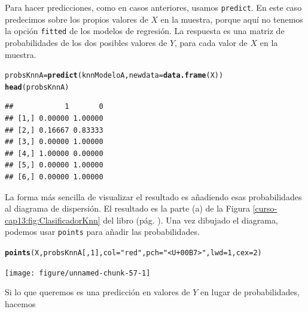 \documentclass[10pt,a4paper]{article}\usepackage[]{graphicx}\usepackage[]{color}
\makeatletter
\newcommand{\hlnum}[1]{\textcolor[rgb]{0.686,0.059,0.569}{#1}}%
\newcommand{\hlstr}[1]{\textcolor[rgb]{0.192,0.494,0.8}{#1}}%
\newcommand{\hlstd}[1]{\textcolor[rgb]{0.345,0.345,0.345}{#1}}%
\newcommand{\hlkwb}[1]{\textcolor[rgb]{0.69,0.353,0.396}{#1}}%
\newcommand{\hlkwc}[1]{\textcolor[rgb]{0.333,0.667,0.333}{#1}}%
\newcommand{\hlkwd}[1]{\textcolor[rgb]{0.737,0.353,0.396}{\textbf{#1}}}%
\newenvironment{kframe}{%
 \def\at@end@of@kframe{}%
 \ifinner\ifhmode%
  \def\at@end@of@kframe{\end{minipage}}%
  \begin{minipage}{\columnwidth}%
 \fi\fi%
 \def\FrameCommand##1{\hskip\@totalleftmargin \hskip-\fboxsep
 \colorbox{shadecolor}{##1}\hskip-\fboxsep
     \hskip-\linewidth \hskip-\@totalleftmargin \hskip\columnwidth}%
 \MakeFramed {\advance\hsize-\width
   \@totalleftmargin\z@ \linewidth\hsize
   \@setminipage}}%
 {\par\unskip\endMakeFramed%
 \at@end@of@kframe}
\newenvironment{knitrout}{}{} %
\makeatother
\begin{document}
Para hacer predicciones, como en casos anteriores, usamos {\tt predict}. En este caso predecimos sobre los propios valores de $X$ en la muestra, porque aquí no tenemos la opción {\tt fitted} de los modelos de regresión. La respuesta es una matriz de probabilidades de los dos posibles valores de  $Y$, para cada valor de $X$ en la muestra.

\begin{knitrout}
\color{fgcolor}\begin{kframe}
\begin{alltt}
\hlstd{probsKnnA} \hlkwb{=} \hlkwd{predict}\hlstd{(knnModeloA,} \hlkwc{newdata} \hlstd{=} \hlkwd{data.frame}\hlstd{(X))}
\hlkwd{head}\hlstd{(probsKnnA)}
\end{alltt}
\begin{verbatim}
##            1       0
## [1,] 0.00000 1.00000
## [2,] 0.16667 0.83333
## [3,] 0.00000 1.00000
## [4,] 1.00000 0.00000
## [5,] 0.00000 1.00000
## [6,] 0.00000 1.00000
\end{verbatim}
\end{kframe}
\end{knitrout}

La forma más sencilla de  visualizar el resultado es añadiendo esas probabilidades al diagrama de dispersión.  El resultado es la parte (a) de la Figura \ref{curso-cap13:fig:ClasificadorKnn} del libro (pág. \pageref{curso-cap13:fig:ClasificadorKnn}). Una vez dibujado el diagrama, podemos usar {\tt points} para añadir las probabilidades.

\begin{knitrout}
\color{fgcolor}\begin{kframe}
\begin{alltt}
\hlkwd{points}\hlstd{(X, probsKnnA[ ,} \hlnum{1}\hlstd{],} \hlkwc{col}\hlstd{=}\hlstr{"red"}\hlstd{,} \hlkwc{pch}\hlstd{=}\hlstr{"<U+00B7>"}\hlstd{,} \hlkwc{lwd}\hlstd{=}\hlnum{1}\hlstd{,} \hlkwc{cex}\hlstd{=}\hlnum{2}\hlstd{)}
\end{alltt}
\end{kframe}

{\centering \texttt{[image: figure/unnamed-chunk-57-1]} 

}



\end{knitrout}

Si lo que queremos es una predicción en valores de $Y$ en lugar de probabilidades, hacemos
\end{document}
